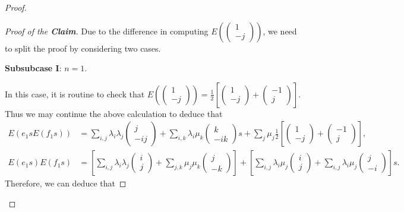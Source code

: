 \documentclass[12pt]{amsart}
\theoremstyle{definition}
\theoremstyle{remark}
\begin{document}
\begin{proof}
\begin{proof}[Proof of the \textbf{Claim}]
Due to the difference in computing $E(\begin{pmatrix}
1\\
-j
\end{pmatrix})$, we need to split the proof by considering two cases.

\textbf{Subsubcase I}: $n=1$.


In this case, it is routine to check that $E(\begin{pmatrix}
1\\
-j
\end{pmatrix})=\frac{1}{2}[\begin{pmatrix}
1\\
-j
\end{pmatrix}+\begin{pmatrix}
-1\\
j
\end{pmatrix}]$. Thus we may continue the above calculation to deduce that 
\begin{align*}
E(e_1sE(f_1s))&=\sum_{i,j}\lambda_i\lambda_j\begin{pmatrix}
j\\
-ij
\end{pmatrix}+\sum_{i, k}\lambda_i\mu_k\begin{pmatrix}
k\\
-ik
\end{pmatrix}s+\sum_j\mu_j\frac{1}{2}[\begin{pmatrix}
1\\
-j
\end{pmatrix}+\begin{pmatrix}
-1\\
j
\end{pmatrix}],\\
E(e_1s)E(f_1s)&=[\sum_{i, j}\lambda_i\lambda_j\begin{pmatrix}
i\\
j
\end{pmatrix}+\sum_{j, k}\mu_j\mu_k\begin{pmatrix}
j\\
-k
\end{pmatrix}]+[\sum_{i,j}\lambda_i\mu_j\begin{pmatrix}
i\\
j
\end{pmatrix}+\sum_{i, j}\lambda_i\mu_j\begin{pmatrix}
j\\
-i
\end{pmatrix}]s.
\end{align*}
Therefore, we can deduce that

\end{proof}
\end{proof}
\end{document}
